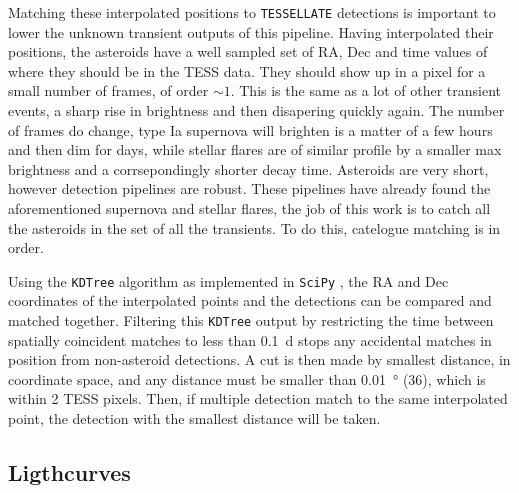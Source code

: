 \documentclass[12pt]{article}
\begin{document}
Matching these interpolated positions to \texttt{TESSELLATE} detections is important to lower the unknown transient outputs of this pipeline.
Having interpolated their positions, the asteroids have a well sampled set of RA, Dec and time values of where they should be in the TESS data.
They should show up in a pixel for a small number of frames, of order $\sim1$.
This is the same as a lot of other transient events, a sharp rise in brightness and then disapering quickly again.
The number of frames do change, type Ia supernova will brighten is a matter of a few hours and then dim for days, while stellar flares are of similar profile by a smaller max brightness and a corrsepondingly shorter decay time.
Asteroids are very short, however detection pipelines are robust.
These pipelines have already found the aforementioned supernova and stellar flares, the job of this work is to catch all the asteroids in the set of all the transients.
To do this, catelogue matching is in order.

Using the \texttt{KDTree} algorithm \citep{Maneewongvatana1999} as implemented in \texttt{SciPy} \citep{2020SciPy-NMeth}, the RA and Dec coordinates of the interpolated points and the detections can be compared and matched together.
Filtering this \texttt{KDTree} output by restricting the time between spatially coincident matches to less than \qty{0.1}{\day} stops any accidental matches in position from non-asteroid detections.
A cut is then made by smallest distance, in coordinate space, and any distance must be smaller than \qty{0.01}{\degree} (\qty{36}{\arcsec}), which is within 2 TESS pixels.
Then, if multiple detection match to the same interpolated point, the detection with the smallest distance will be taken.




\subsection{Ligthcurves}\label{SubSec:Lightcurves}
\end{document}
